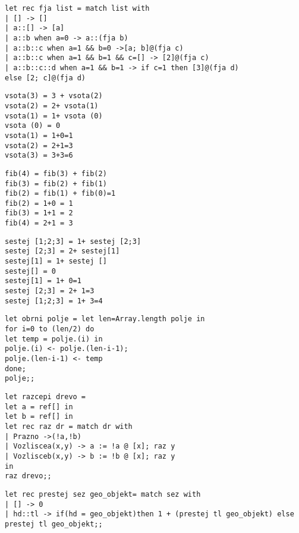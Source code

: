 \begin{Odgovor}{22}
\begin{verbatim}
let rec fja list = match list with
| [] -> []
| a::[] -> [a]
| a::b when a=0 -> a::(fja b)
| a::b::c when a=1 && b=0 ->[a; b]@(fja c)
| a::b::c when a=1 && b=1 && c=[] -> [2]@(fja c)
| a::b::c::d when a=1 && b=1 -> if c=1 then [3]@(fja d)
else [2; c]@(fja d)
\end{verbatim}
\end{Odgovor}
\begin{Odgovor}{26}
\begin{verbatim}
vsota(3) = 3 + vsota(2)
vsota(2) = 2+ vsota(1)
vsota(1) = 1+ vsota (0)
vsota (0) = 0
vsota(1) = 1+0=1
vsota(2) = 2+1=3
vsota(3) = 3+3=6
\end{verbatim}
\end{Odgovor}
\begin{Odgovor}{27}
\begin{verbatim}
fib(4) = fib(3) + fib(2)
fib(3) = fib(2) + fib(1)
fib(2) = fib(1) + fib(0)=1
fib(2) = 1+0 = 1
fib(3) = 1+1 = 2
fib(4) = 2+1 = 3
\end{verbatim}
\end{Odgovor}
\begin{Odgovor}{28}
\begin{verbatim}
sestej [1;2;3] = 1+ sestej [2;3]
sestej [2;3] = 2+ sestej[1]
sestej[1] = 1+ sestej []
sestej[] = 0
sestej[1] = 1+ 0=1
sestej [2;3] = 2+ 1=3
sestej [1;2;3] = 1+ 3=4
\end{verbatim}
\end{Odgovor}
\begin{Odgovor}{36}
\begin{verbatim}
let obrni polje = let len=Array.length polje in
for i=0 to (len/2) do
let temp = polje.(i) in
polje.(i) <- polje.(len-i-1);
polje.(len-i-1) <- temp
done;
polje;;
\end{verbatim}
\end{Odgovor}
\begin{Odgovor}{38}
\begin{verbatim}
let razcepi drevo =
let a = ref[] in
let b = ref[] in
let rec raz dr = match dr with
| Prazno ->(!a,!b)
| Vozliscea(x,y) -> a := !a @ [x]; raz y
| Vozlisceb(x,y) -> b := !b @ [x]; raz y
in
raz drevo;;
\end{verbatim}
\end{Odgovor}
\begin{Odgovor}{40}
\begin{verbatim}
let rec prestej sez geo_objekt= match sez with
| [] -> 0
| hd::tl -> if(hd = geo_objekt)then 1 + (prestej tl geo_objekt) else prestej tl geo_objekt;;
\end{verbatim}
\end{Odgovor}
